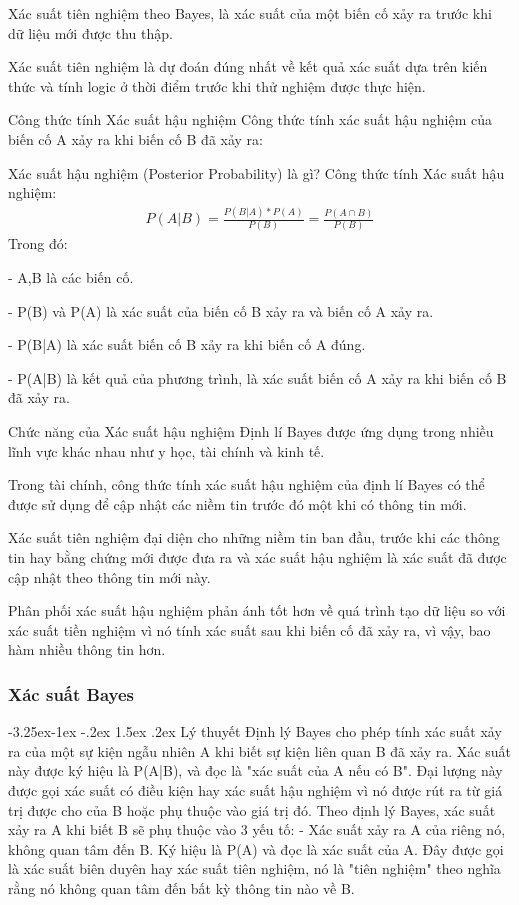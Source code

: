 \documentclass[a4paper]{article}
\makeatletter
\newcounter {subsubsubsection}[subsubsection]
\newcommand\subsubsubsection{\@startsection{subsubsubsection}{4}{\z@}%
                                     {-3.25ex\@plus -1ex \@minus -.2ex}%
                                     {1.5ex \@plus .2ex}%
                                     {\normalfont\normalsize\bfseries}}
\makeatother
\begin{document}
Xác suất tiên nghiệm theo Bayes, là xác suất của một biến cố xảy ra trước khi dữ liệu mới được thu thập. 

Xác suất tiên nghiệm là dự đoán đúng nhất về kết quả xác suất dựa trên kiến thức và tính logic ở thời điểm trước khi thử nghiệm được thực hiện.

Công thức tính Xác suất hậu nghiệm 
Công thức tính xác suất hậu nghiệm của biến cố A xảy ra khi biến cố B đã xảy ra: 

Xác suất hậu nghiệm (Posterior Probability) là gì? Công thức tính Xác suất hậu nghiệm:
\begin{align}
	P(A|B)=\frac{P(B|A)*P(A)}{P(B)}=\frac{P(A\cap B)}{P(B)}
\end{align}
Trong đó:

- A,B là các biến cố.

- P(B) và P(A) là xác suất của biến cố B xảy ra và biến cố A xảy ra. 

- P(B|A) là xác suất biến cố B xảy ra khi biến cố A đúng. 

- P(A|B) là kết quả của phương trình, là xác suất biến cố A xảy ra khi biến cố B đã xảy ra. 

Chức năng của Xác suất hậu nghiệm 
Định lí Bayes được ứng dụng trong nhiều lĩnh vực khác nhau như y học, tài chính và kinh tế. 

Trong tài chính, công thức tính xác suất hậu nghiệm của định lí Bayes có thể được sử dụng để cập nhật các niềm tin trước đó một khi có thông tin mới. 

Xác suất tiên nghiệm đại diện cho những niềm tin ban đầu, trước khi các thông tin hay bằng chứng mới được đưa ra và xác suất hậu nghiệm là xác suất đã được cập nhật theo thông tin mới này. 

Phân phối xác suất hậu nghiệm phản ánh tốt hơn về quá trình tạo dữ liệu so với xác suất tiền nghiệm vì nó tính xác suất sau khi biến cố đã xảy ra, vì vậy, bao hàm nhiều thông tin hơn.   



\subsubsection{Xác suất Bayes}
\subsubsubsection{Lý thuyết}
Định lý Bayes cho phép tính xác suất xảy ra của một sự kiện ngẫu nhiên A khi biết sự kiện liên quan B đã xảy ra. Xác suất này được ký hiệu là P(A|B), và đọc là "xác suất của A nếu có B". Đại lượng này được gọi xác suất có điều kiện hay xác suất hậu nghiệm vì nó được rút ra từ giá trị được cho của B hoặc phụ thuộc vào giá trị đó.
Theo định lý Bayes, xác suất xảy ra A khi biết B sẽ phụ thuộc vào 3 yếu tố:
- Xác suất xảy ra A của riêng nó, không quan tâm đến B. Ký hiệu là P(A) và đọc là xác suất của A. Đây được gọi là xác suất biên duyên hay xác suất tiên nghiệm, nó là "tiên nghiệm" theo nghĩa rằng nó không quan tâm đến bất kỳ thông tin nào về B.
\end{document}
